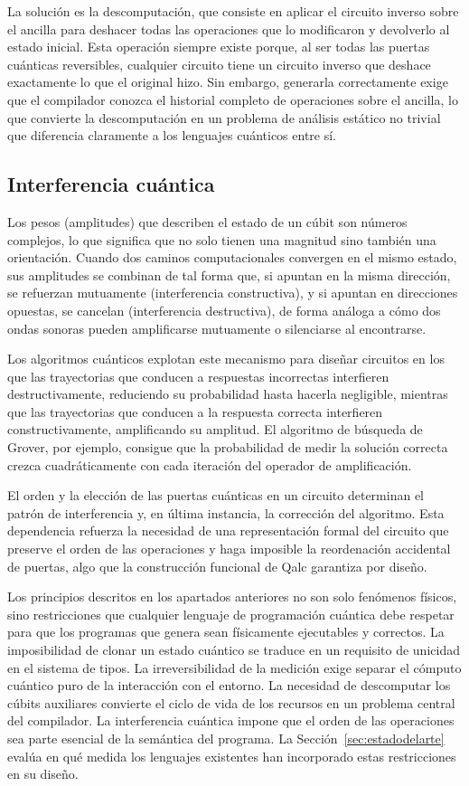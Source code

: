 La solución es la descomputación, que consiste en aplicar el circuito inverso sobre el ancilla para deshacer todas las operaciones que lo modificaron y devolverlo al estado inicial. Esta operación siempre existe porque, al ser todas las puertas cuánticas reversibles, cualquier circuito tiene un circuito inverso que deshace exactamente lo que el original hizo. Sin embargo, generarla correctamente exige que el compilador conozca el historial completo de operaciones sobre el ancilla, lo que convierte la descomputación en un problema de análisis estático no trivial que diferencia claramente a los lenguajes cuánticos entre sí.

\subsection{Interferencia cuántica}
\label{subsec:interferencia}

Los pesos (amplitudes) que describen el estado de un cúbit son números complejos, lo que significa que no solo tienen una magnitud sino también una orientación. Cuando dos caminos computacionales convergen en el mismo estado, sus amplitudes se combinan de tal forma que, si apuntan en la misma dirección, se refuerzan mutuamente (interferencia constructiva), y si apuntan en direcciones opuestas, se cancelan (interferencia destructiva), de forma análoga a cómo dos ondas sonoras pueden amplificarse mutuamente o silenciarse al encontrarse.

Los algoritmos cuánticos explotan este mecanismo para diseñar circuitos en los que las trayectorias que conducen a respuestas incorrectas interfieren destructivamente, reduciendo su probabilidad hasta hacerla negligible, mientras que las trayectorias que conducen a la respuesta correcta interfieren constructivamente, amplificando su amplitud. El algoritmo de búsqueda de Grover, por ejemplo, consigue que la probabilidad de medir la solución correcta crezca cuadráticamente con cada iteración del operador de amplificación.

El orden y la elección de las puertas cuánticas en un circuito determinan el patrón de interferencia y, en última instancia, la corrección del algoritmo. Esta dependencia refuerza la necesidad de una representación formal del circuito que preserve el orden de las operaciones y haga imposible la reordenación accidental de puertas, algo que la construcción funcional de Qalc garantiza por diseño.

Los principios descritos en los apartados anteriores no son solo fenómenos físicos, sino restricciones que cualquier lenguaje de programación cuántica debe respetar para que los programas que genera sean físicamente ejecutables y correctos. La imposibilidad de clonar un estado cuántico se traduce en un requisito de unicidad en el sistema de tipos. La irreversibilidad de la medición exige separar el cómputo cuántico puro de la interacción con el entorno. La necesidad de descomputar los cúbits auxiliares convierte el ciclo de vida de los recursos en un problema central del compilador. La interferencia cuántica impone que el orden de las operaciones sea parte esencial de la semántica del programa. La Sección~\ref{sec:estadodelarte} evalúa en qué medida los lenguajes existentes han incorporado estas restricciones en su diseño.

